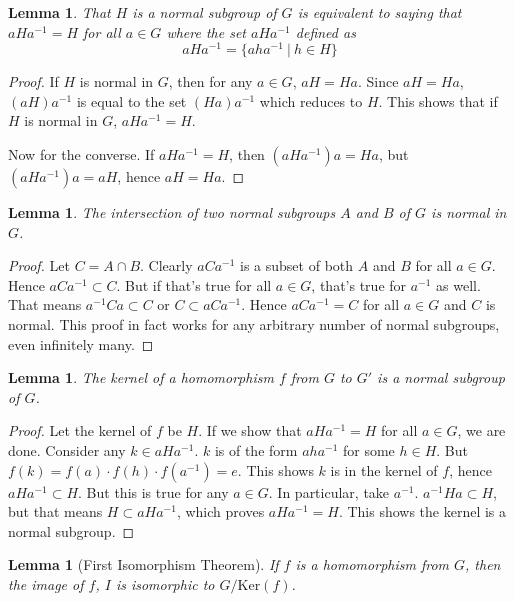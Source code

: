 \documentclass[12pt, titlepage]{article}
\newtheorem{lem}[thm]{Lemma}
\theoremstyle{definition}
\begin{document}
\begin{lem}
That $H$ is a normal subgroup of $G$ is equivalent to saying that $aHa^{-1}=H$ for all $a \in G$ where the set $aHa^{-1}$ defined as 
$$aHa^{-1}=\{aha^{-1}\ |\ h \in H\}$$
\end{lem}

\begin{proof}
If $H$ is normal in $G$, then for any $a \in G$, $aH=Ha$. Since $aH=Ha$, $(aH)a^{-1}$ is equal to the set $(Ha)a^{-1}$ which reduces to $H$. This shows that if $H$ is normal in $G$, $aHa^{-1}=H$.

Now for the converse. If $aHa^{-1}=H$, then $(aHa^{-1})a = Ha$, but $(aHa^{-1})a = aH$, hence $aH = Ha$.
\end{proof}

\begin{lem}\label{normal}
The intersection of two normal subgroups $A$ and $B$ of $G$ is normal in $G$.
\end{lem}

\begin{proof}
Let $C = A \cap B$. Clearly $aCa^{-1}$ is a subset of both $A$ and $B$ for all $a \in G$. Hence $aCa^{-1} \subset C$. But if that's true for all $a \in G$, that's true for $a^{-1}$ as well. That means $a^{-1}Ca \subset C$ or $C \subset aCa^{-1}$. Hence $aCa^{-1} = C$ for all $a \in G$ and $C$ is normal. This proof in fact works for any arbitrary number of normal subgroups, even infinitely many.
\end{proof}

\begin{lem}
The kernel of a homomorphism $f$ from $G$ to $G'$ is a normal subgroup of $G$.
\end{lem}

\begin{proof}
Let the kernel of $f$ be $H$. If we show that $aHa^{-1}=H$ for all $a \in G$, we are done. Consider any $k \in aHa^{-1}$. $k$ is of the form $aha^{-1}$ for some $h \in H$. But $f(k)= f(a) \cdot f(h) \cdot f(a^{-1}) = e$. This shows $k$ is in the kernel of $f$, hence $aHa^{-1} \subset H$. But this is true for any $a \in G$. In particular, take $a^{-1}$. $a^{-1}Ha \subset H$, but that means $H \subset aHa^{-1}$, which proves $aHa^{-1}=H$. This shows the kernel is a normal subgroup.
\end{proof}

\begin{lem}[First Isomorphism Theorem]
If $f$ is a homomorphism from $G$, then the image of $f$, $I$ is isomorphic to $G/\mathrm{Ker}(f)$.
\end{lem}
\end{document}

